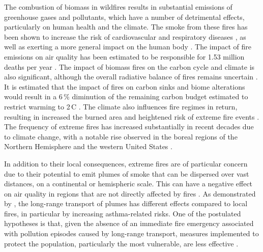 \documentclass[acp, manuscript]{copernicus}
\begin{document}
\copyrightstatement{} %


\introduction %

The combustion of biomass in wildfires results in substantial emissions of greenhouse gases and pollutants, which have a number of detrimental effects, particularly on human health and the climate. The smoke from these fires has been shown to increase the risk of cardiovascular and respiratory diseases \citep{karanasiouShorttermHealthEffects2021,aguileraWildfireSmokeImpacts2021}, as well as exerting a more general impact on the human body \citep{liuSystematicReviewPhysical2015,heft-nealAssociationsWildfireSmoke2022}. The impact of fire emissions on air quality has been estimated to be responsible for 1.53 million deaths per year \citep{xuGlobalRegionalNational2024}. The impact of biomass fires on the carbon cycle and climate is also significant, although the overall radiative balance of fires remains uncertain \citep{lasslopInfluenceFireCarbon2019,liuBiophysicalFeedbackGlobal2019}. It is estimated that the impact of fires on carbon sinks and biome alterations would result in a 6\,\% diminution of the remaining carbon budget estimated to restrict warming to 2\,\textdegree C \citep{burtonFireWeakensLand2024}. The climate also influences fire regimes in return, resulting in increased the burned area \citep{burtonGlobalBurnedArea2024} and heightened risk of extreme fire events \citep{jainObservedIncreasesExtreme2022a,brownClimateWarmingIncreases2023}. The frequency of extreme fires has increased substantially in recent decades due to climate change, with a notable rise observed in the boreal regions of the Northern Hemisphere and the western United States \citep{cunninghamIncreasingFrequencyIntensity2024}. 



In addition to their local consequences, extreme fires are of particular concern due to their potential to emit plumes of smoke that can be dispersed over vast distances, on a continental or hemispheric scale. This can have a negative effect on air quality in regions that are not directly affected by fires \citep{kollanusEffectsLongrangeTransported2016,wuIntracontinentalWildfireSmoke2018,huLongrangetransportedCanadianSmoke2019b,hungImpactsTransportedWildfire2020a,silverLargeTransboundaryHealth2024}. As demonstrated by \citet{magzamenDifferentialCardiopulmonaryHealth2021}, the long-range transport of plumes has different effects compared to local fires, in particular by increasing asthma-related risks. One of the postulated hypotheses is that, given the absence of an immediate fire emergency associated with pollution episodes caused by long-range transport, measures implemented to protect the population, particularly the most vulnerable, are less effective \citep{magzamenDifferentialCardiopulmonaryHealth2021}. 
\end{document}
